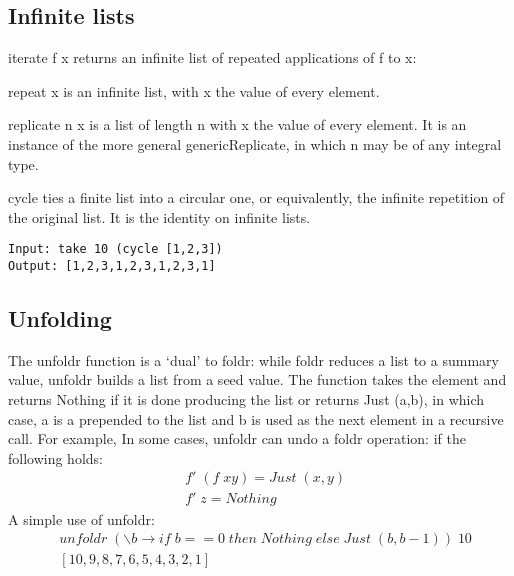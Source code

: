 \subsection{Infinite lists}
iterate f x returns an infinite list of repeated applications of f to x:

repeat x is an infinite list, with x the value of every element.

replicate n x is a list of length n with x the value of every element. It is an instance of the more general genericReplicate, in which n may be of any integral type.

cycle ties a finite list into a circular one, or equivalently, the infinite repetition of the original list. It is the identity on infinite lists.
\example
\begin{lstlisting}
Input: take 10 (cycle [1,2,3])
Output: [1,2,3,1,2,3,1,2,3,1]
\end{lstlisting}

\subsection{Unfolding}
The unfoldr function is a `dual' to foldr: while foldr reduces a list to a summary value, unfoldr builds a list from a seed value. The function takes the element and returns Nothing if it is done producing the list or returns Just (a,b), in which case, a is a prepended to the list and b is used as the next element in a recursive call. For example,
In some cases, unfoldr can undo a foldr operation:
if the following holds:
\begin{align*}
	&f'\; (f\; x y) = Just\; (x,y)\\
	&f'\; z       = Nothing
\end{align*}
A simple use of unfoldr:
\begin{align*}
	&unfoldr\; (\backslash b \rightarrow if\; b == 0\; then\; Nothing\; else\; Just\; (b, b-1))\; 10\\
	&[10,9,8,7,6,5,4,3,2,1]
\end{align*}
